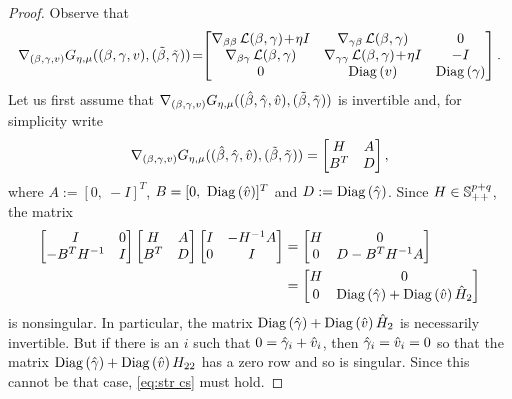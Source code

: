 \begin{proof}
Observe that
\begin{equation}\label{eq:nabla G}
\nabla_{(\beta, \gamma,v)}G_{\eta,\mu}((\beta, \gamma,v),(\tilde\beta,{\tilde{\gamma}}))
\!=\!\!
\begin{bmatrix}
\nabla_{\beta\beta}\operatorname{\mathcal{L}}(\beta,\gamma)\!+\!\eta I&
\nabla_{\gamma\beta}\operatorname{\mathcal{L}}(\beta,\gamma)&0\\
\nabla_{\beta\gamma}\operatorname{\mathcal{L}}(\beta,\gamma)&\nabla_{\gamma\gamma}\operatorname{\mathcal{L}}(\beta,\gamma)
\!+\!\eta I&-I
\\
0&\mathrm{Diag}\left(v\right)&\mathrm{Diag}\left(\gamma\right)
\end{bmatrix}.
\end{equation}
Let us first assume that 
$\nabla_{(\beta, \gamma,v)}G_{\eta,\mu}((\hat{\beta}, {\hat{\gamma}},{\hat v}),(\tilde\beta,{\tilde{\gamma}}))$
is invertible and, for simplicity write  
\[
\nabla_{(\beta, \gamma,v)}G_{\eta,\mu}((\hat{\beta}, {\hat{\gamma}},{\hat v}),(\tilde\beta,{\tilde{\gamma}}))
=\begin{bmatrix}H&A\\ B^T&D\end{bmatrix},
\]
where $A:=[0,\ -I]^T$, $B=[0,\ \mathrm{Diag}\left({\hat v}\right)]^T$ and $D:=\mathrm{Diag}\left({\hat{\gamma}}\right)$. 
Since $H\in\operatorname{\mathbb{S}}^{p+q}_{++}$,
the matrix
\begin{equation}\label{eq:grad G inv1}
\begin{aligned}
\begin{bmatrix}I&0\\ -B^TH^{-1}&I\end{bmatrix}
\begin{bmatrix}H&A\\ B^T&D\end{bmatrix}
\begin{bmatrix}I&-H^{-1}A\\ 0&I\end{bmatrix}&=
\begin{bmatrix}H&0\\ 0&D-B^TH^{-1}A\end{bmatrix}
\\ &=\begin{bmatrix}H&0\\ 0&\mathrm{Diag}\left({\hat{\gamma}}\right)+\mathrm{Diag}\left({\hat v}\right)\hat H_{2}\end{bmatrix}
\end{aligned}
\end{equation}
is nonsingular. In particular, the matrix $\mathrm{Diag}\left({\hat{\gamma}}\right)+\mathrm{Diag}\left({\hat v}\right)\hat H_{2}$ is
necessarily invertible.
But if there is an $i$ such that $0={\hat{\gamma}}_i+{\hat v}_i$, then ${\hat{\gamma}}_i={\hat v}_i=0$
so that the matrix $\mathrm{Diag}\left({\hat{\gamma}}\right)+\mathrm{Diag}\left({\hat v}\right)H_{22}$ has a zero row and so
is singular. Since this cannot be that case,
\eqref{eq:str cs} must hold.


\end{proof}
